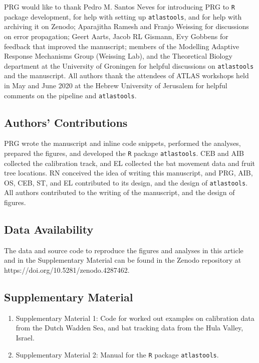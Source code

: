 \documentclass[10pt,paper=a4,headings=standardclasses
]{scrartcl}
\begin{document}
PRG would like to thank Pedro M. Santos Neves for introducing PRG to \texttt{R} package development, for help with setting up \texttt{atlastools}, and for help with archiving it on Zenodo; 
Aparajitha Ramesh and Franjo Weissing for discussions on error propagation;
Geert Aarts, Jacob RL Gismann, Evy Gobbens for feedback that improved the manuscript; 
members of the Modelling Adaptive Response Mechanisms Group (Weissing Lab), and the Theoretical Biology department at the University of Groningen for helpful discussions on \texttt{atlastools} and the manuscript.
All authors thank the attendees of ATLAS workshops held in May and June 2020 at the Hebrew University of Jerusalem for helpful comments on the pipeline and \texttt{atlastools}.

\subsection{Authors' Contributions}

PRG wrote the manuscript and inline code snippets, performed the analyses, prepared the figures, and developed the \texttt{R} package \texttt{atlastools}.
CEB and AIB collected the calibration track, and EL collected the bat movement data and fruit tree locations.
RN conceived the idea of writing this manuscript, and PRG, AIB, OS, CEB, ST, and EL contributed to its design, and the design of \texttt{atlastools}.
All authors contributed to the writing of the manuscript, and the design of figures.

\subsection{Data Availability}

The data and source code to reproduce the figures and analyses in this article and in the Supplementary Material can be found in the Zenodo repository at https://doi.org/10.5281/zenodo.4287462.

\subsection{Supplementary Material}
\begin{enumerate}
    \item Supplementary Material 1: Code for worked out examples on calibration data from the Dutch Wadden Sea, and bat tracking data from the Hula Valley, Israel.
    \item Supplementary Material 2: Manual for the \texttt{R} package \texttt{atlastools}.
\end{enumerate}
\end{document}
